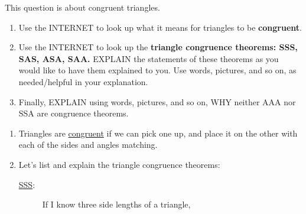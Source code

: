 \documentclass{ximera}
\begin{document}
\begin{question} This question is about congruent triangles.
  \begin{enumerate}
  \item Use the INTERNET to look up what it means for triangles to be
  \textbf{congruent}.
  \item Use the INTERNET to look up the \textbf{triangle congruence
    theorems: SSS, SAS, ASA, SAA.} EXPLAIN the statements of these
    theorems as you would like to have them explained to you. Use
    words, pictures, and so on, as needed/helpful in your explanation.
  \item Finally, EXPLAIN using words, pictures, and so on, WHY neither AAA
  nor SSA are congruence theorems.
  \end{enumerate}

  \begin{freeResponse}
    \begin{enumerate}
    \item Triangles are \underline{congruent} if we can pick one up,
      and place it on the other with each of the sides and angles
      matching.

    \item Let's list and explain the triangle congruence theorems:
    \begin{description}
    \item[\bsifamily\underline{SSS}:] If I know three side lengths
      of a triangle,
      \begin{center}
\end{center}
\end{description}
\end{enumerate}
\end{freeResponse}
\end{question}
\end{document}

